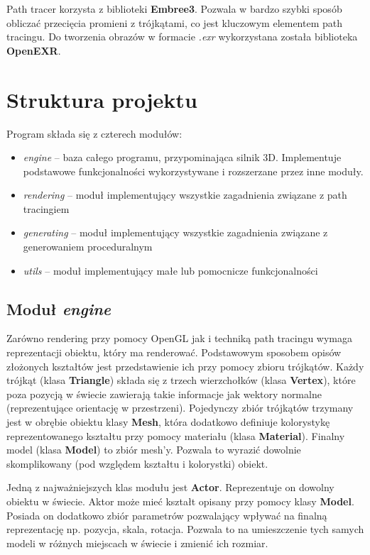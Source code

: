 \documentclass[inz,longabstract]{iithesis}
\begin{document}
        Path tracer korzysta z biblioteki \textbf{Embree3}. Pozwala w bardzo szybki sposób obliczać przecięcia promieni z trójkątami, co jest kluczowym elementem path tracingu. Do tworzenia obrazów w formacie \textit{.exr} wykorzystana została biblioteka \textbf{OpenEXR}.
    \section{Struktura projektu}
        Program składa się z czterech modułów:
        \begin{itemize}
            \item \textit{engine} -- baza całego programu, przypominająca silnik 3D. Implementuje podstawowe funkcjonalności wykorzystywane i rozszerzane przez inne moduły. 
            \item \textit{rendering} -- moduł implementujący wszystkie zagadnienia związane z path tracingiem
            \item \textit{generating} -- moduł implementujący wszystkie zagadnienia związane z generowaniem proceduralnym
            \item \textit{utils} -- moduł implementujący małe lub pomocnicze funkcjonalności
        \end{itemize}
        
        \subsection{Moduł \textit{engine}}
            Zarówno rendering przy pomocy OpenGL jak i techniką path tracingu wymaga reprezentacji obiektu, który ma renderować. Podstawowym sposobem opisów złożonych kształtów jest przedstawienie ich przy pomocy zbioru trójkątów. Każdy trójkąt (klasa \textbf{Triangle}) składa się z trzech wierzchołków (klasa \textbf{Vertex}), które poza pozycją w świecie zawierają takie informacje jak wektory normalne (reprezentujące orientację w przestrzeni). Pojedynczy zbiór trójkątów trzymany jest w obrębie obiektu klasy \textbf{Mesh}, która dodatkowo definiuje kolorystykę reprezentowanego kształtu przy pomocy materiału (klasa \textbf{Material}). Finalny model (klasa \textbf{Model}) to zbiór mesh'y. Pozwala to wyrazić dowolnie skomplikowany (pod względem kształtu i kolorystki) obiekt. 
            
            Jedną z najważniejszych klas modułu jest \textbf{Actor}. Reprezentuje on dowolny obiektu w świecie. Aktor może mieć kształt opisany przy pomocy klasy \textbf{Model}. Posiada on dodatkowo zbiór parametrów pozwalający wpływać na finalną reprezentację np. pozycja, skala, rotacja. Pozwala to na umieszczenie tych samych modeli w różnych miejscach w świecie i zmienić ich rozmiar.
            
\end{document}
